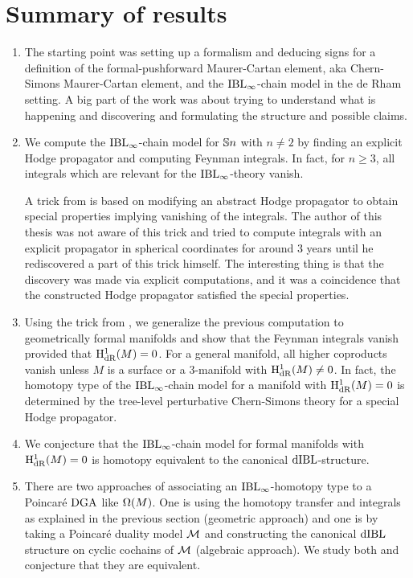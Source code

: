 \documentclass[\MainFolder/Text.tex]{subfiles}
\begin{document}
\section{Summary of results}

\begin{enumerate}[label=\arabic*)]
\item The starting point was setting up a formalism and deducing signs for a definition of the formal-pushforward Maurer-Cartan element, aka Chern-Simons Maurer-Cartan element, and the $\mathrm{IBL}_\infty$-chain model in the de Rham setting.
A big part of the work was about trying to understand what is happening and discovering and formulating the structure and possible claims.

\item We compute the $\mathrm{IBL}_\infty$-chain model for $\mathbb{S}{n}$ with $n\neq 2$ by finding an explicit Hodge propagator and computing Feynman integrals.
In fact, for $n\ge 3$, all integrals which are relevant for the $\mathrm{IBL}_\infty$-theory vanish.
 
A trick from \cite{Mnev2009} is based on modifying an abstract Hodge propagator to obtain special properties implying vanishing of the integrals.
The author of this thesis was not aware of this trick and tried to compute integrals with an explicit propagator in spherical coordinates for around 3 years until he rediscovered a part of this trick himself. 
The interesting thing is that the discovery was made via explicit computations, and it was a coincidence that the constructed Hodge propagator satisfied the special properties.
 
\item Using the trick from \cite{Mnev2009}, we generalize the previous computation to geometrically formal manifolds and show that the Feynman integrals vanish provided that $\mathrm{H}_{\mathrm{dR}}^1(M) = 0$.
For a general manifold, all higher coproducts vanish unless $M$ is a surface or a $3$-manifold with $\mathrm{H}_{\mathrm{dR}}^1(M) \neq 0$.
In fact, the homotopy type of the $\mathrm{IBL}_\infty$-chain model for a manifold with $\mathrm{H}_{\mathrm{dR}}^1(M) = 0$ is determined by the tree-level perturbative Chern-Simons theory for a special Hodge propagator.

\item We conjecture that the $\mathrm{IBL}_\infty$-chain model for formal manifolds with $\mathrm{H}_{\mathrm{dR}}^1(M) = 0$ is homotopy equivalent to the canonical $\mathrm{dIBL}$-structure.

\item There are two approaches of associating an $\mathrm{IBL}_\infty$-homotopy type to a Poincar\'e $\mathrm{DGA}$ like $\Omega(M)$.
One is using the homotopy transfer and integrals as explained in the previous section (geometric approach) and one is by taking a Poincar\'e duality model $\mathcal{M}$ and constructing the canonical $\mathrm{dIBL}$ structure on cyclic cochains of $\mathcal{M}$ (algebraic approach).
We study both and conjecture that they are equivalent. 


\end{enumerate}
\end{document}

